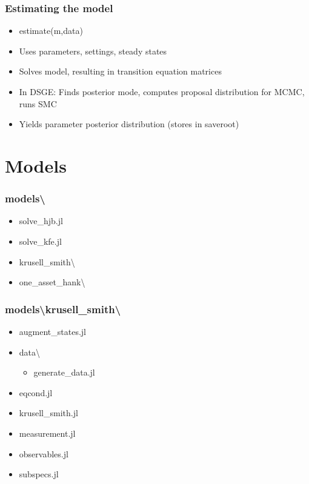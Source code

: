 \documentclass{beamer}
\begin{document}
\begin{frame}
\frametitle{Estimating the model}
\begin{itemize}
\item estimate(m,data)
\item Uses parameters, settings, steady states
\item Solves model, resulting in transition equation matrices
\item In DSGE: Finds posterior mode, computes proposal distribution for MCMC, runs SMC
\item Yields parameter posterior distribution (stores in saveroot)
\end{itemize}
\end{frame}

\section{Models}

\begin{frame}
\frametitle{models\textbackslash}
  \begin{itemize}
    \item solve\_hjb.jl
    \item solve\_kfe.jl
    \item krusell\_smith\textbackslash
    \item one\_asset\_hank\textbackslash
  \end{itemize}
\end{frame}

\begin{frame}
\frametitle{models\textbackslash krusell\_smith\textbackslash}
     \begin{itemize}
      \item augment\_states.jl
      \item data\textbackslash
      \begin{itemize}
        \item generate\_data.jl
       \end{itemize}
      \item eqcond.jl
      \item krusell\_smith.jl
      \item measurement.jl
      \item observables.jl
      \item subspecs.jl
    \end{itemize}
\end{frame}
\end{document}
